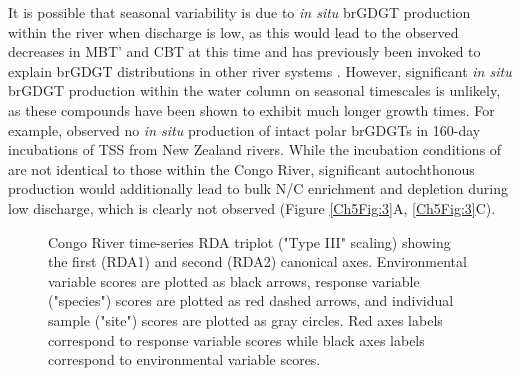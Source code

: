 It is possible that seasonal variability is due to \textit{in situ} brGDGT production within the river when discharge is low, as this would lead to the observed decreases in MBT' and CBT at this time \citep{Peterse:2009hl,Tierney:2010br} and has previously been invoked to explain brGDGT distributions in other river systems \citep{DeJonge:2014fs,Zell:2014gt}. However, significant \textit{in situ} brGDGT production within the water column on seasonal timescales is unlikely, as these compounds have been shown to exhibit much longer growth times. For example, \citet{Peterse:2015ef} observed no \textit{in situ} production of intact polar brGDGTs in 160-day incubations of TSS from New Zealand rivers. While the incubation conditions of \citet{Peterse:2015ef} are not identical to those within the Congo River, significant autochthonous production would additionally lead to bulk N/C enrichment and  depletion during low discharge, which is clearly not observed (Figure \ref{Ch5Fig:3}A, \ref{Ch5Fig:3}C).

\begin{figure}[ht ]
	\caption[Environmental parameter, bulk metrics, and GDGT distribution RDA analysis]{Congo River time-series RDA triplot ("Type III" scaling) showing the first (RDA1) and second (RDA2) canonical axes. Environmental variable scores are plotted as black arrows, response variable ("species") scores are plotted as red dashed arrows, and individual sample ("site") scores are plotted as gray circles. Red axes labels correspond to response variable scores while black axes labels correspond to environmental variable scores.}
	\label{Ch5Fig:8} 
\end{figure}


